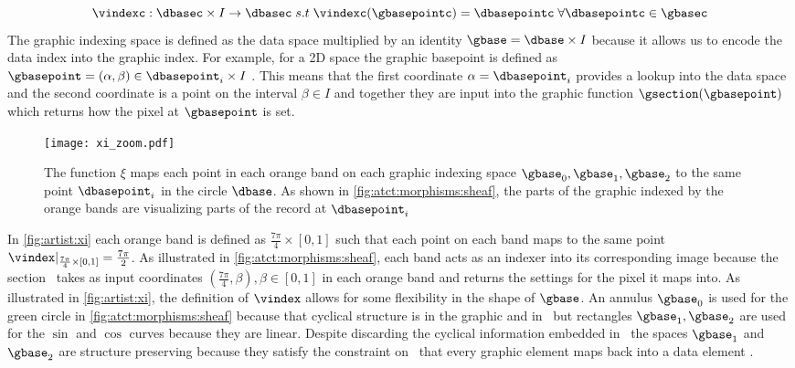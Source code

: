 \documentclass[journal]{IEEEtran}
\theoremstyle{definition}
\theoremstyle{remark}
\begin{document}
\begin{equation}
  \vindexc: \dbasec \times I \rightarrow \dbasec\;s.t\;\vindexc(\gbasepointc) = \dbasepointc\;\forall \dbasepointc \in \gbasec
\end{equation}
The graphic indexing space is defined as the data space multiplied by an identity $\gbase = \dbase\times I$ because it allows us to encode the data index into the graphic index. For example, for a 2D space the graphic basepoint is defined as $\gbasepoint=(\alpha,\beta) \in \dbasepoint_i\times I$ . This means that the first coordinate $\alpha=\dbasepoint_i$ provides a lookup into the data space and the second coordinate is a point on the interval $\beta \in I$ and together they are input into the graphic function $\gsection(\gbasepoint)$ which returns how the pixel at $\gbasepoint$ is set.

\begin{figure}[H]
  \texttt{[image: xi\_zoom.pdf]}
  \caption{The function $\xi$ maps each point in each orange band on each graphic indexing space $\gbase_0, \gbase_1, \gbase_2$ to the same point $\dbasepoint_i$ in the circle $\dbase$. As shown in \autoref{fig:atct:morphisms:sheaf}, the parts of the graphic indexed by the orange bands are visualizing parts of the record at $\dbasepoint_i$ \label{fig:artist:xi}}
\end{figure}

In \autoref{fig:artist:xi} each orange band is defined as $\frac{7\pi}{4}\times [0,1]$ such that each point on each band maps to the same point $\vindex|_{\frac{7\pi}{4}\times [0,1]} = \frac{7\pi}{2}$. As illustrated in \autoref{fig:atct:morphisms:sheaf}, each band acts as an indexer into its corresponding image because the section \gsection\ takes as input coordinates $(\frac{7\pi}{4}, \beta), \beta \in [0,1]$ in each orange band and returns the settings for the pixel it maps into. As illustrated in \autoref{fig:artist:xi}, the definition of $\vindex$ allows for some flexibility in the shape of $\gbase$. An annulus $\gbase_0$ is used for the green circle in \autoref{fig:atct:morphisms:sheaf} because that cyclical structure is in the graphic and in \dbase\, but rectangles $\gbase_1, \gbase_2$ are used for the $\sin$ and $\cos$ curves because they are linear. Despite discarding the cyclical information embedded in \dbase\, the spaces $\gbase_1$ and $\gbase_2$ are structure preserving because they satisfy the constraint on \vindex\ that every graphic element maps back into a data element \cite{ziemkiewiczEmbeddingInformationVisualization2009}.
\end{document}
